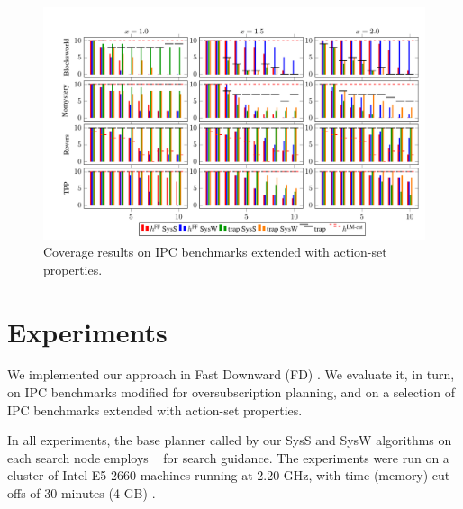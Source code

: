 

\newcommand{\scatterplotsize}{8cm}
\newcommand{\scatterplotxlabelshift}{1.5ex}
\newcommand{\scatterplotylabelshift}{-3ex}




\begin{figure}[htb]
\centering\centering
%
\includegraphics{data/action_set_properties/barchart/barchart.pdf}
\vspace{-0.6cm}
\caption{Coverage results on IPC benchmarks extended with action-set properties.}
\label{fig:barcharts}
\vspace{-0.2cm}
\end{figure}


\section{Experiments}
\label{experiments}

We implemented our approach in Fast Downward
(FD) \cite{helmert:jair-06}. We evaluate it, in turn, on IPC
benchmarks modified for oversubscription planning, and on a selection
of IPC benchmarks extended with action-set properties.

In all experiments, the base planner called by our SysS and SysW
algorithms on each search node
employs \hff\ \cite{hoffmann:nebel:jair-01} for search guidance.
%
%
The experiments were run on a cluster of Intel E5-2660 machines
running at 2.20 GHz, with time (memory) cut-offs of 30 minutes (4
GB) .



